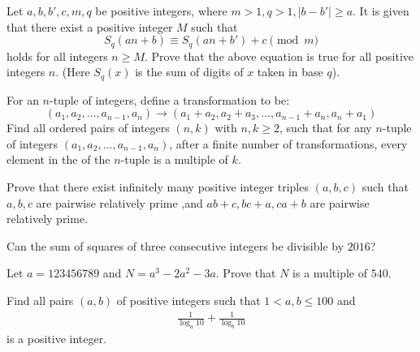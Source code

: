 \documentclass[problems.tex]{subfile}
\begin{document}
	\begin{problem}
		Let $a,b,b',c,m,q$ be positive integers, where $m>1,q>1,|b-b'|\ge a$. It is given that there exist a positive integer $M$ such that
		$$S_q(an+b)\equiv S_q(an+b')+c\pmod{m}$$
		holds for all integers $n\ge M$. Prove that the above equation is true for all positive integers $n$. (Here $S_q(x)$ is the sum of digits of $x$ taken in base $q$). %
	\end{problem}

	\begin{problem}
		For an $n$-tuple of integers, define a transformation to be:
		$$(a_1,a_2,\dots,a_{n-1},a_n)\rightarrow (a_1+a_2, a_2+a_3, \dots, a_{n-1}+a_n, a_n+a_1)$$
		Find all ordered pairs of integers $(n,k)$ with $n,k\geq 2$, such that for any $n$-tuple of integers $(a_1,a_2,\dots,a_{n-1},a_n)$, after a finite number of transformations, every element in the of the $n$-tuple is a multiple of $k$. %
	\end{problem}

	\begin{problem}
		Prove that there exist infinitely many positive integer triples $(a,b,c)$ such that $a ,b,c$ are pairwise relatively prime ,and $ab+c ,bc+a ,ca+b$ are pairwise relatively prime. %
	\end{problem}

	\begin{problem}
		Can the sum of squares of three consecutive integers be divisible by $2016$?
	\end{problem}

	\begin{problem}
		Let $a = 123456789$ and $N = a^3 - 2a^2 - 3a$. Prove that $N$ is a multiple of $540$.
	\end{problem}

	\begin{problem}
		Find all pairs $(a, b)$ of positive integers such that $1 < a, b \leq 100$ and
		\begin{align*}
			\frac{1}{\log_a 10} + \frac{1}{\log_b 10}
		\end{align*}
		is a positive integer.
	\end{problem}
\end{document}
